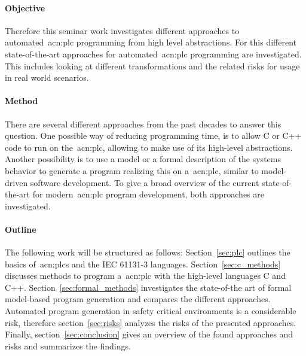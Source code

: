 \paragraph{Objective}
Therefore this seminar work investigates different approaches to automated~\gls{acn:plc} programming from high level abstractions.
For this different state-of-the-art approaches for automated~\gls{acn:plc} programming are investigated.
This includes looking at different transformations and the related risks for usage in real world scenarios.
\paragraph{Method}
There are several different approaches from the past decades to answer this question.
One possible way of reducing programming time, is to allow C or C++ code to run on the~\gls{acn:plc}, allowing to make use of its high-level abstractions.
Another possibility is to use a model or a formal description of the systems behavior to generate a program realizing this on a~\gls{acn:plc}, similar to model-driven software development.
To give a broad overview of the current state-of-the-art for modern~\gls{acn:plc} program development, both approaches are investigated.
\paragraph{Outline}
The following work will be structured as follows: 
Section~\ref{sec:plc} outlines the basics of~\glspl{acn:plc} and the IEC 61131-3 languages. 
Section~\ref{sec:c_methods} discusses methods to program a~\gls{acn:plc} with the high-level languages C and C++.
Section~\ref{sec:formal_methods} investigates the state-of-the art of formal model-based program generation and compares the different approaches.
Automated program generation in safety critical environments is a considerable risk, therefore section~\ref{sec:risks} analyzes the risks of the presented approaches.
Finally, section~\ref{sec:conclusion} gives an overview of the found approaches and risks and summarizes the findings.